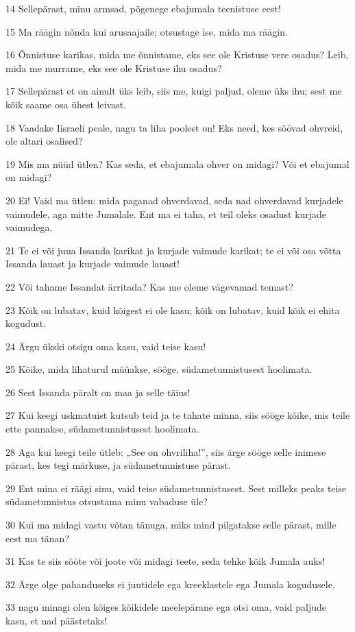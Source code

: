 \par 14 Sellepärast, minu armsad, põgenege ebajumala teenistuse eest!
\par 15 Ma räägin nõnda kui arusaajaile; otsustage ise, mida ma räägin.
\par 16 Õnnistuse karikas, mida me õnnistame, eks see ole Kristuse vere osadus? Leib, mida me murrame, eks see ole Kristuse ihu osadus?
\par 17 Sellepärast et on ainult üks leib, siis me, kuigi paljud, oleme üks ihu; sest me kõik saame osa ühest leivast.
\par 18 Vaadake Iisraeli peale, nagu ta liha poolest on! Eks need, kes söövad ohvreid, ole altari osalised?
\par 19 Mis ma nüüd ütlen? Kas seda, et ebajumala ohver on midagi? Või et ebajumal on midagi?
\par 20 Ei! Vaid ma ütlen: mida paganad ohverdavad, seda nad ohverdavad kurjadele vaimudele, aga mitte Jumalale. Ent ma ei taha, et teil oleks osadust kurjade vaimudega.
\par 21 Te ei või juua Issanda karikat ja kurjade vaimude karikat; te ei või osa võtta Issanda lauast ja kurjade vaimude lauast!
\par 22 Või tahame Issandat ärritada? Kas me oleme vägevamad temast?
\par 23 Kõik on lubatav, kuid kõigest ei ole kasu; kõik on lubatav, kuid kõik ei ehita kogudust.
\par 24 Ärgu ükski otsigu oma kasu, vaid teise kasu!
\par 25 Kõike, mida lihaturul müüakse, sööge, südametunnistusest hoolimata.
\par 26 Sest Issanda päralt on maa ja selle täius!
\par 27 Kui keegi uskmatuist kutsub teid ja te tahate minna, siis sööge kõike, mis teile ette pannakse, südametunnistusest hoolimata.
\par 28 Aga kui keegi teile ütleb: „See on ohvriliha!”, siis ärge sööge selle inimese pärast, kes tegi märkuse, ja südametunnistuse pärast.
\par 29 Ent mina ei räägi sinu, vaid teise südametunnistusest. Sest milleks peaks teise südametunnistus otsustama minu vabaduse üle?
\par 30 Kui ma midagi vastu võtan tänuga, miks mind pilgatakse selle pärast, mille eest ma tänan?
\par 31 Kas te siis sööte või joote või midagi teete, seda tehke kõik Jumala auks!
\par 32 Ärge olge pahanduseks ei juutidele ega kreeklastele ega Jumala kogudusele,
\par 33 nagu minagi olen kõiges kõikidele meelepärane ega otsi oma, vaid paljude kasu, et nad päästetaks!


